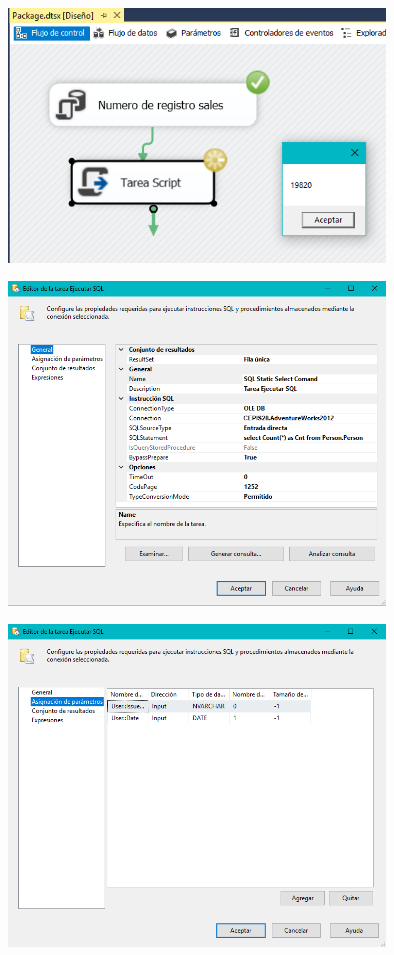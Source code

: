 	\begin{center}
	\includegraphics[width=10cm]{imagenes/img22}
    \end{center}	
    
	\begin{center}
	\includegraphics[width=10cm]{imagenes/img23}
    \end{center}	
    
	\begin{center}
	\includegraphics[width=10cm]{imagenes/img24}
    \end{center}	
    
